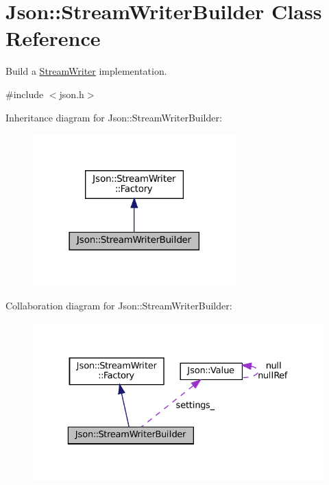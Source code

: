 \hypertarget{classJson_1_1StreamWriterBuilder}{}\section{Json\+:\+:Stream\+Writer\+Builder Class Reference}
\label{classJson_1_1StreamWriterBuilder}


Build a \hyperlink{classJson_1_1StreamWriter}{Stream\+Writer} implementation.  




{\ttfamily \#include $<$json.\+h$>$}



Inheritance diagram for Json\+:\+:Stream\+Writer\+Builder\+:
\nopagebreak
\begin{figure}[H]
\begin{center}
\leavevmode
\includegraphics[width=222pt]{classJson_1_1StreamWriterBuilder__inherit__graph}
\end{center}
\end{figure}


Collaboration diagram for Json\+:\+:Stream\+Writer\+Builder\+:
\nopagebreak
\begin{figure}[H]
\begin{center}
\leavevmode
\includegraphics[width=329pt]{classJson_1_1StreamWriterBuilder__coll__graph}
\end{center}
\end{figure}
